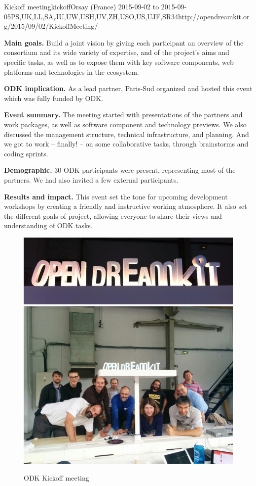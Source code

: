\begin{event}{\ODK Kickoff meeting}{kickoff}{Orsay (France) 2015-09-02 to 2015-09-05}{PS,UK,LL,SA,JU,UW,USH,UV,ZH,USO,US,UJF,SR}{34}{http://opendreamkit.org/2015/09/02/KickoffMeeting/}

  \textbf{Main goals.} Build a joint vision by giving each participant
  an overview of the consortium and its wide variety of expertise, and
  of the project’s aims and specific tasks, as well as to expose them
  with key software components, web platforms and technologies in the
  ecosystem.

  \textbf{ODK implication.} As a lead partner, Paris-Sud organized and
  hosted this event which was fully funded by ODK.

  \textbf{Event summary.} The meeting started with presentations of
  the partners and work packages, as well as software component and
  technology previews. We also discussed the management structure,
  technical infrastructure, and planning. And we got to work –
  finally!  – on some collaborative tasks, through brainstorms and
  coding sprints.

  \textbf{Demographic.} 30 ODK participants were present, representing
  most of the partners. We had also invited a few external
  participants.

  \textbf{Results and impact.} This event set the tone for upcoming
  development workshops by creating a friendly and instructive working
  atmosphere. It also set the different goals of project, allowing
  everyone to share their views and understanding of ODK tasks.

  \begin{figure}[ht]
    \caption*{ODK Kickoff meeting}
    \includegraphics[scale=0.3]{pictures/kickoff1.jpg}
    \includegraphics[scale=0.5]{pictures/kickoff2.jpg}
  \end{figure}
\end{event}
